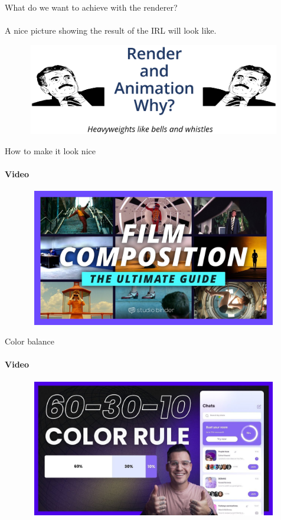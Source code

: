 \documentclass[aspectratio=169]{beamer}
\begin{document}
\begin{frame}[t]{What do we want to achieve with the renderer?}
\framesubtitle{}
    \centering \LARGE A nice picture showing the result of the IRL will look like.

    \begin{figure}[H]
        \centering\includegraphics[height=4cm,width=1\textwidth,keepaspectratio]{why.png}
        \label{fig:why.png}
    \end{figure}

\end{frame}

\begin{frame}[t]{How to make it look nice}
    \framesubtitle{Video}
    \vspace{-0.6cm}
    \begin{figure}[H]
        \href{https://youtu.be/hUmZldt0DTg}{
            \centering\includegraphics[height=6cm,width=1\textwidth,keepaspectratio]{filmcomposition_video.jpg}}
        \label{fig:filmcomposition_video.jpg}
    \end{figure}
\end{frame}

\begin{frame}[t]{Color balance}
    \framesubtitle{Video}
    \vspace{-0.6cm}
    \begin{figure}[H]
        \href{https://youtu.be/UWwNIMHFdW4}{
            \centering\includegraphics[height=6cm,width=1\textwidth,keepaspectratio]{color_video.jpg}}
        \label{fig:color_video.jpg}
    \end{figure}
\end{frame}
\end{document}

